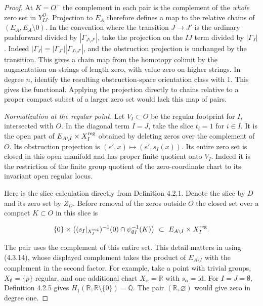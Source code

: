 \begin{proof}
At $K=O^+$ the complement in each pair is the complement of the
\emph{whole} zero set in $Y^O_{IJ}$. Projection to $E_A$ therefore
defines a map to the relative chains of $(E_A,E_A\setminus0)$.
In the convention where the transition $J\to J'$ is the ordinary
pushforward divided by $|\Gamma_{J\setminus J'}|$, take the
projection on the $IJ$ term divided by $|\Gamma_J|$. Indeed
$|\Gamma_J|=|\Gamma_{J'}||\Gamma_{J\setminus J'}|$, and the
obstruction projection is unchanged by the transition. This gives
a chain map from the homotopy colimit by the augmentation on
strings of length zero, with value zero on higher strings. In
degree $n$, identify the resulting obstruction-space orientation
class with $1$. This gives the functional. Applying the projection
directly to chains relative to a proper compact subset of a larger
zero set would lack this map of pairs.

\par\smallskip\noindent\emph{Normalization at the regular point.} Let $V_I\subset O$ be the regular
footprint for $I$, intersected with $O$. In the diagonal term
$I=J$, take the slice $t_i=1$ for $i\in I$. It is the open part
of $E_{A\setminus I}\times X_I^{\rm reg}$ obtained by deleting
zeros over the complement of $O$. Its obstruction projection is
$(e',x)\mapsto(e',s_I(x))$. Its entire zero set is closed in
this open manifold and has proper finite quotient onto $V_I$.
Indeed it is the restriction of the finite group quotient of the
zero-coordinate chart to its invariant open regular locus.

Here is the slice calculation directly from Definition 4.2.1.
Denote the slice by $D$ and its zero set by $Z_D$. Before removal
of the zeros outside $O$ the closed set over a compact $K\subset O$
in this slice is

\[
       \{0\}\times\big((s_I|_{X_I^{\rm reg}})^{-1}(0)
                       \cap\psi_{\emptyset I}^{-1}(K)\big)
       \ \subset\ E_{A\setminus I}\times X_I^{\rm reg}.
\]

The pair uses the complement of this entire set. This detail
matters in using (4.3.14), whose displayed complement takes the
product of $E_{A\setminus I}$ with the complement in the second
factor. For example, take a point with trivial groups,
$X_\emptyset=\{p\}$ regular, and one additional chart
$X_\alpha=\mathbb R$ with $s_\alpha=\mathrm{id}$. For
$I=J=\emptyset$, Definition 4.2.5 gives
$H_1(\mathbb R,\mathbb R\setminus\{0\})=\mathbb Q$.
The pair $(\mathbb R,\varnothing)$ would give zero in degree one.


\end{proof}
